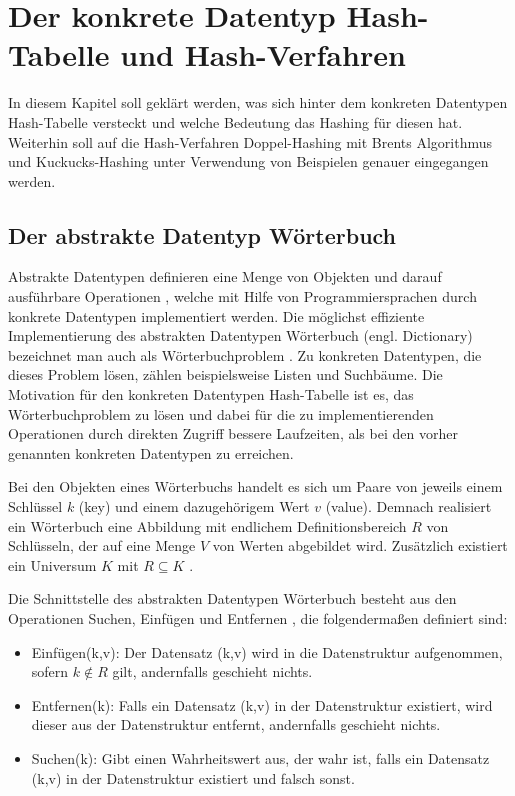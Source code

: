 \chapter{Der konkrete Datentyp Hash-Tabelle und Hash-Verfahren}\label{hash}
In diesem Kapitel soll geklärt werden, was sich hinter dem konkreten Datentypen Hash-Tabelle versteckt und welche Bedeutung das Hashing für diesen hat. Weiterhin soll auf die Hash-Verfahren Doppel-Hashing mit Brents Algorithmus und Kuckucks-Hashing unter Verwendung von Beispielen genauer eingegangen werden.

\section{Der abstrakte Datentyp Wörterbuch}
Abstrakte Datentypen definieren eine Menge von Objekten und darauf ausführbare Operationen \cite[S.~26]{ADSOttWid}, welche mit Hilfe von Programmiersprachen durch konkrete Datentypen implementiert werden. Die möglichst effiziente Implementierung des abstrakten Datentypen Wörterbuch (engl. Dictionary) bezeichnet man auch als Wörterbuchproblem \cite[S.~49]{ADSOttWid}. Zu konkreten Datentypen, die dieses Problem lösen, zählen beispielsweise Listen und Suchbäume. Die Motivation für den konkreten Datentypen Hash-Tabelle ist es, das Wörterbuchproblem zu lösen und dabei für die zu implementierenden Operationen durch direkten Zugriff \cite[S.~235]{ADSWeiWei} bessere Laufzeiten, als bei den vorher genannten konkreten Datentypen zu erreichen. 

Bei den Objekten eines Wörterbuchs handelt es sich um Paare von jeweils einem Schlüssel \(k\) (key) und einem dazugehörigem Wert \(v\) (value). Demnach realisiert ein Wörterbuch eine Abbildung mit endlichem Definitionsbereich \(R\) von Schlüsseln, der auf eine Menge \(V\) von Werten abgebildet wird. Zusätzlich existiert ein Universum \(K\) mit \(R\subseteq{K}\) \cite[S.~191]{ADSOttWid}. 

Die Schnittstelle des abstrakten Datentypen Wörterbuch besteht aus den Operationen Suchen, Einfügen und Entfernen \cite[S.~49]{ADSOttWid}, die folgendermaßen definiert sind:
\begin{itemize}	
\item Einfügen(k,v): Der Datensatz (k,v) wird in die Datenstruktur aufgenommen, sofern \(k\notin{R}\) gilt, andernfalls geschieht nichts.
\item Entfernen(k): Falls ein Datensatz (k,v) in der Datenstruktur existiert, wird dieser aus der Datenstruktur entfernt, andernfalls geschieht nichts.
\item Suchen(k): Gibt einen Wahrheitswert aus, der wahr ist, falls ein Datensatz (k,v) in der Datenstruktur existiert und falsch sonst.
\end{itemize}

